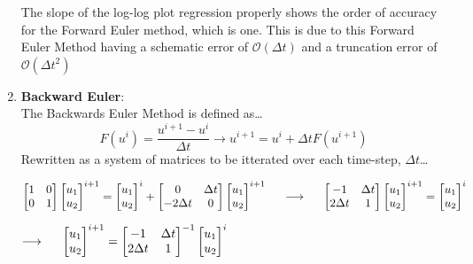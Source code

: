\documentclass[12pt,letterpaper]{article}
\begin{document}
\begin{enumerate}
The slope of the log-log plot regression properly shows the order of accuracy for the Forward Euler method, which is one. 
This is due to this Forward Euler Method having a schematic error of $\mathcal{O}(\Delta t)$ and a truncation error of $\mathcal{O}(\Delta t^{2})$ 
\newpage
	\item \textbf{Backward Euler}:\\
	
The Backwards Euler Method is defined as\ldots
\begin{equation}
    F(u^{i}) = \frac{u^{i+1}-u^{i}}{\Delta t} \longrightarrow u^{i+1} = u^{i} + \Delta t  F(u^{i+1})
\end{equation}
Rewritten as a system of matrices to be itterated over each time-step, $\Delta t$\ldots
\begin{center} 
    $\begin{bmatrix} 1&0 \\ 0&1 \end{bmatrix} \begin{bmatrix} u_{1} \\ u_{2} \end{bmatrix}^{i+1} = \begin{bmatrix} u_{1} \\ u_{2} \end{bmatrix}^{i} + \begin{bmatrix} 0&\Delta t \\ -2\Delta t &0 \end{bmatrix}\begin{bmatrix} u_{1} \\ u_{2} \end{bmatrix}^{i+1} \hspace{0.5 cm} \longrightarrow \hspace{0.5 cm} \begin{bmatrix} -1&\Delta t \\ 2\Delta t &1 \end{bmatrix} \begin{bmatrix} u_{1} \\ u_{2} \end{bmatrix}^{i+1} = \begin{bmatrix} u_{1} \\ u_{2} \end{bmatrix}^{i}$
\end{center}
\begin{center} 
    $\longrightarrow \hspace{0.5 cm}\begin{bmatrix} u_{1} \\ u_{2} \end{bmatrix}^{i+1} = \begin{bmatrix} -1&\Delta t \\ 2\Delta t &1 \end{bmatrix}^{-1} \begin{bmatrix} u_{1} \\ u_{2} \end{bmatrix}^{i}$
\end{center}


\end{enumerate}
\end{document}
